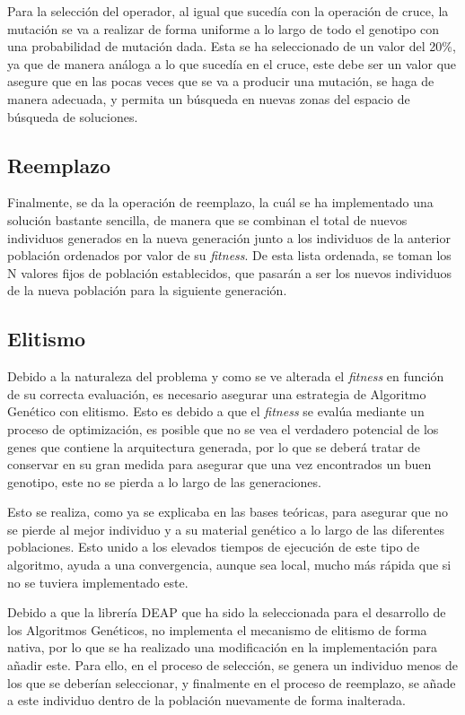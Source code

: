 Para la selección del operador, al igual que sucedía con la operación de cruce, la mutación se va a realizar de forma uniforme a lo largo de todo el genotipo con una probabilidad de mutación dada. Esta se ha seleccionado de un valor del 20\%, ya que de manera análoga a lo que sucedía en el cruce, este debe ser un valor que asegure que en las pocas veces que se va a producir una mutación, se haga de manera adecuada, y permita un búsqueda en nuevas zonas del espacio de búsqueda de soluciones.

\subsection{Reemplazo}

Finalmente, se da la operación de reemplazo, la cuál se ha implementado una solución bastante sencilla, de manera que se combinan el total de nuevos individuos generados en la nueva generación junto a los individuos de la anterior población ordenados por valor de su \textit{fitness}. De esta lista ordenada, se toman los N valores fijos de población establecidos, que pasarán a ser los nuevos individuos de la nueva población para la siguiente generación.

\subsection{Elitismo}

Debido a la naturaleza del problema y como se ve alterada el \textit{fitness} en función de su correcta evaluación, es necesario asegurar una estrategia de Algoritmo Genético con elitismo. Esto es debido a que el \textit{fitness} se evalúa mediante un proceso de optimización, es posible que no se vea el verdadero potencial de los genes que contiene la arquitectura generada, por lo que se deberá tratar de conservar en su gran medida para asegurar que una vez encontrados un buen genotipo, este no se pierda a lo largo de las generaciones.

Esto se realiza, como ya se explicaba en las bases teóricas, para asegurar que no se pierde al mejor individuo y a su material genético a lo largo de las diferentes poblaciones. Esto unido a los elevados tiempos de ejecución de este tipo de algoritmo, ayuda a una convergencia, aunque sea local, mucho más rápida que si no se tuviera implementado este.

Debido a que la librería DEAP que ha sido la seleccionada para el desarrollo de los Algoritmos Genéticos, no implementa el mecanismo de elitismo de forma nativa, por lo que se ha realizado una modificación en la implementación para añadir este. Para ello, en el proceso de selección, se genera un individuo menos de los que se deberían seleccionar, y finalmente en el proceso de reemplazo, se añade a este individuo dentro de la población nuevamente de forma inalterada.


